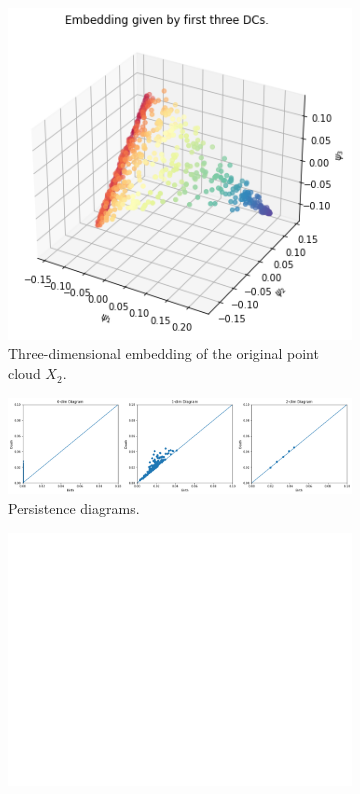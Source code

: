 \begin{figure}[H]
\centering
\begin{subfigure}[b]{0.2\textwidth}
    \includegraphics[width=\textwidth]{figures/X2_embedding.png}
    \caption{Three-dimensional embedding of the original point cloud $X_2$.}
\end{subfigure}
\hfill
\begin{subfigure}[b]{0.75\textwidth}
    \includegraphics[width=\textwidth]{figures/X2_H0.png}
    \caption{Persistence diagrams.}
\end{subfigure}
\begin{subfigure}[b]{0.25\textwidth}
\includegraphics[width=\textwidth]{figures/white.png} 

\end{subfigure}
\end{figure}
